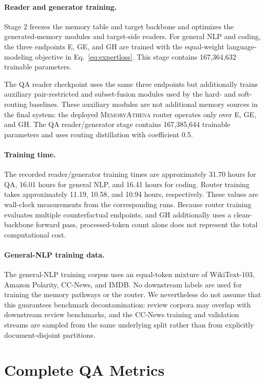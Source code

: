 \paragraph{Reader and generator training.}
Stage 2 freezes the memory table and target backbone and optimizes the
generated-memory modules and target-side readers. For general NLP and coding,
the three endpoints E, GE, and GH are trained with the equal-weight
language-modeling objective in Eq.~\ref{eq:expertloss}. This stage contains
167,364,632 trainable parameters.

The QA reader checkpoint uses the same three endpoints but additionally trains
auxiliary pair-restricted and subset-fusion modules used by the hard- and
soft-routing baselines. These auxiliary modules are not additional memory
sources in the final system: the deployed \textsc{MemoryAthena} router operates
only over E, GE, and GH. The QA reader/generator stage contains 167,385,644
trainable parameters and uses routing distillation with coefficient 0.5.


\paragraph{Training time.}
The recorded reader/generator training times are approximately 31.70 hours for
QA, 16.01 hours for general NLP, and 16.41 hours for coding. Router training
takes approximately 11.19, 10.58, and 10.94 hours, respectively. These values
are wall-clock measurements from the corresponding runs. Because router
training evaluates multiple counterfactual endpoints, and GH additionally uses
a clean-backbone forward pass, processed-token count alone does not represent
the total computational cost.


\paragraph{General-NLP training data.}
The general-NLP training corpus uses an equal-token mixture of WikiText-103,
Amazon Polarity, CC-News, and IMDB. No downstream labels are used for training
the memory pathways or the router. We nevertheless do not assume that this
guarantees benchmark decontamination: review corpora may overlap with
downstream review benchmarks, and the CC-News training and validation streams
are sampled from the same underlying split rather than from explicitly
document-disjoint partitions.
\section{Complete QA Metrics}
\label{app:qa}

